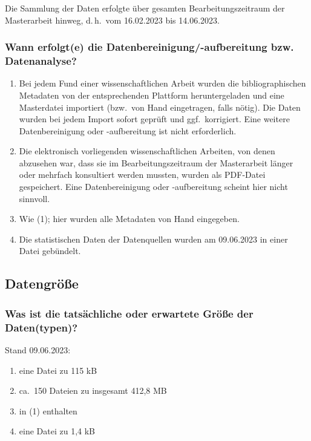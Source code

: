 Die Sammlung der Daten erfolgte über gesamten Bearbeitungszeitraum der Masterarbeit hinweg, d.\,h.\ vom 16.02.2023 bis 14.06.2023.

\subsubsection{Wann erfolgt(e) die Datenbereinigung/-aufbereitung bzw. Datenanalyse?}

\begin{enumerate}[(1)]
  \item
    Bei jedem Fund einer wissenschaftlichen Arbeit wurden die bibliographischen Metadaten von der entsprechenden Plattform heruntergeladen
    und eine Masterdatei importiert (bzw.\ von Hand eingetragen, falls nötig). Die Daten wurden bei jedem Import sofort geprüft und ggf.\
    korrigiert. Eine weitere Datenbereinigung oder -aufbereitung ist nicht erforderlich.
  \item
    Die elektronisch vorliegenden wissenschaftlichen Arbeiten, von denen abzusehen war, dass sie im Bearbeitungszeitraum der Masterarbeit
    länger oder mehrfach konsultiert werden mussten, wurden als PDF-Datei gespeichert.
    Eine Datenbereinigung oder -aufbereitung scheint hier nicht sinnvoll.
  \item
    Wie (1); hier wurden alle Metadaten von Hand eingegeben.
  \item
    Die statistischen Daten der Datenquellen wurden am 09.06.2023 in einer Datei gebündelt.
\end{enumerate}

\subsection{Datengröße}

\subsubsection{Was ist die tatsächliche oder erwartete Größe der Daten(typen)?}

Stand 09.06.2023:
%
\begin{enumerate}[(1)]
  \item
    eine Datei zu 115 kB
  \item
    ca.\ 150 Dateien zu insgesamt 412,8 MB
  \item
    in (1) enthalten
  \item
    eine Datei zu 1,4 kB
\end{enumerate}

